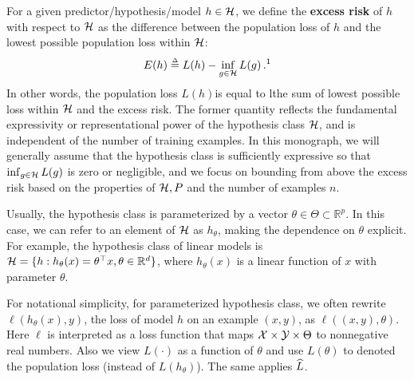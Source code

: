For a given predictor/hypothesis/model $h \in \mathcal H$, we define the \textbf{excess risk} of $h$ with respect to $\mathcal H$ as the difference between the population loss of $h$ and the lowest possible population loss within $\mathcal H$:
\begin{align}
E(h) \defeq{} L(h) - \inf_{g\in\cH} L(g)\,.\text{\footnotemark}
\end{align}
In other words, the population loss $L(h)$is equal to lthe sum of lowest possible loss within $\mathcal H$ and the excess risk.  The former quantity reflects the fundamental expressivity or representational power of the hypothesis class $\mathcal H$, and is independent of the number of training examples. In this monograph, we will generally assume that the hypothesis class is sufficiently expressive so that $\inf_{g\in\mathcal H} L(g)$ is zero or negligible, and we focus on bounding from above the excess risk based on the properties of $\mathcal H, P$ and the number of examples $n$.  

Usually, the hypothesis class is parameterized by a vector $\theta \in \Theta \subset \mathbb{R}^p$. In this case, we can refer to an element of $\mathcal H$ as $h_\theta$, making the dependence on $\theta$ explicit. For example, the hypothesis class of linear models is $\mathcal H = \{ h: h_\theta(x) = \theta^\top x, \theta \in \mathbb{R}^d \}$, where $h_\theta(x)$ is a linear function of $x$ with parameter $\theta$.

For notational simplicity, for parameterized hypothesis class, we often rewrite $\ell(h_\theta(x), y)$, the loss of model $h$ on an example $(x,y)$, as $\ell((x,y), \theta)$. Here $\ell$ is interpreted as a loss function that maps $\mathcal X\times \mathcal Y \times \Theta$ to nonnegative real numbers. Also we view $L(\cdot)$ as a function of $\theta$ and use $L(\theta)$ to denoted the population loss (instead of $L(h_\theta)$). The same applies $\widehat{L}$. 


